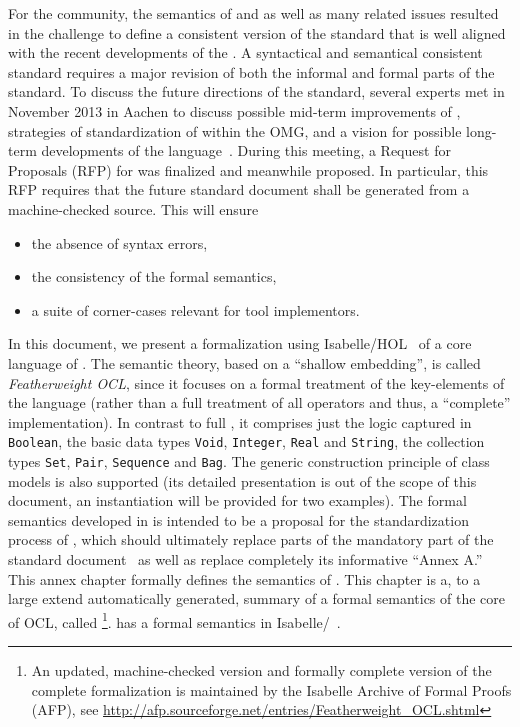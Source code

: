 For the \OCL community, the semantics of  and
 as well as many related issues resulted in the
challenge to define a consistent version of the \OCL standard that is
well aligned with the recent developments of the \UML\@. A syntactical
and semantical consistent standard requires a major revision of both
the informal and formal parts of the standard. To discuss the future
directions of the standard, several \OCL experts met in November 2013
in Aachen to discuss possible mid-term improvements of \OCL, strategies
of standardization of \OCL within the OMG, and a vision for possible
long-term developments of the
language~\cite{brucker.ea:summary-aachen:2013}. During this meeting, a
Request for Proposals (RFP) for  was finalized and meanwhile
proposed. In particular, this RFP requires that the future 
standard document shall be generated from a machine-checked
source. This will ensure
\begin{itemize}
\item the absence of syntax errors,
\item the consistency of the formal semantics,
\item a suite of corner-cases relevant for \OCL tool implementors.
\end{itemize}

In this document, we present a formalization using
Isabelle/HOL~\cite{nipkow.ea:isabelle:2002} of a core language of
\OCL\@. The semantic theory, based on a ``shallow embedding'', is
called \emph{Featherweight OCL}, since it focuses on a formal
treatment of the key-elements of the language (rather than a full
treatment of all operators and thus, a ``complete''
implementation). In contrast to full \OCL, it comprises just the logic
captured in \verb+Boolean+, the basic data types \verb+Void+,
\verb+Integer+, \verb+Real+ and \verb+String+, the collection types
\verb+Set+, \verb+Pair+, \verb+Sequence+ and \verb+Bag+. The generic
construction principle of class models is also
supported (its detailed presentation is out of the scope of this document, an
instantiation will be provided for two examples).
The formal semantics developed in \FOCL
is intended to be a proposal for the standardization
process of , which should ultimately replace parts of the
mandatory part of the standard document~\cite{omg:ocl:2012} as well as
replace completely its informative ``Annex A.''
\endisatagafp
\isatagannexa
This annex chapter formally defines the semantics of \OCL\@. This
chapter is a, to a large extend automatically generated, summary of a
formal semantics of the core of OCL, called \FOCL\footnote{An updated,
  machine-checked version and formally complete version of the
  complete formalization is maintained by the Isabelle Archive of
  Formal Proofs (AFP), see
  \url{http://afp.sourceforge.net/entries/Featherweight_OCL.shtml}}. \FOCL
has a formal semantics in Isabelle/\HOL~\cite{nipkow.ea:isabelle:2002}.
\endisatagannexa

